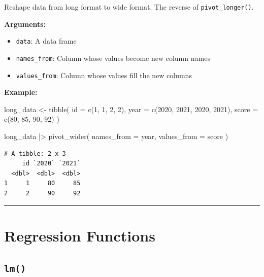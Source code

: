 \documentclass[
  letterpaper,
  DIV=11,
  numbers=noendperiod]{scrreprt}
\newenvironment{Shaded}{\begin{snugshade}}{\end{snugshade}}
\newcommand{\AttributeTok}[1]{\textcolor[rgb]{0.40,0.45,0.13}{#1}}
\newcommand{\DecValTok}[1]{\textcolor[rgb]{0.68,0.00,0.00}{#1}}
\newcommand{\FunctionTok}[1]{\textcolor[rgb]{0.28,0.35,0.67}{#1}}
\newcommand{\NormalTok}[1]{\textcolor[rgb]{0.00,0.23,0.31}{#1}}
\newcommand{\OtherTok}[1]{\textcolor[rgb]{0.00,0.23,0.31}{#1}}
\newcommand{\SpecialCharTok}[1]{\textcolor[rgb]{0.37,0.37,0.37}{#1}}
\providecommand{\tightlist}{%
  \setlength{\itemsep}{0pt}\setlength{\parskip}{0pt}}
\begin{document}
Reshape data from long format to wide format. The reverse of
\texttt{pivot\_longer()}.

\textbf{Arguments:}

\begin{itemize}
\tightlist
\item
  \texttt{data}: A data frame
\item
  \texttt{names\_from}: Column whose values become new column names
\item
  \texttt{values\_from}: Column whose values fill the new columns
\end{itemize}

\textbf{Example:}

\begin{Shaded}
\begin{Highlighting}[]
\NormalTok{long\_data }\OtherTok{\textless{}{-}} \FunctionTok{tibble}\NormalTok{(}
  \AttributeTok{id =} \FunctionTok{c}\NormalTok{(}\DecValTok{1}\NormalTok{, }\DecValTok{1}\NormalTok{, }\DecValTok{2}\NormalTok{, }\DecValTok{2}\NormalTok{),}
  \AttributeTok{year =} \FunctionTok{c}\NormalTok{(}\DecValTok{2020}\NormalTok{, }\DecValTok{2021}\NormalTok{, }\DecValTok{2020}\NormalTok{, }\DecValTok{2021}\NormalTok{),}
  \AttributeTok{score =} \FunctionTok{c}\NormalTok{(}\DecValTok{80}\NormalTok{, }\DecValTok{85}\NormalTok{, }\DecValTok{90}\NormalTok{, }\DecValTok{92}\NormalTok{)}
\NormalTok{)}

\NormalTok{long\_data }\SpecialCharTok{|\textgreater{}}
  \FunctionTok{pivot\_wider}\NormalTok{(}
    \AttributeTok{names\_from =}\NormalTok{ year,}
    \AttributeTok{values\_from =}\NormalTok{ score}
\NormalTok{  )}
\end{Highlighting}
\end{Shaded}

\begin{verbatim}
# A tibble: 2 x 3
     id `2020` `2021`
  <dbl>  <dbl>  <dbl>
1     1     80     85
2     2     90     92
\end{verbatim}

\begin{center}\rule{0.5\linewidth}{0.5pt}\end{center}

\section{Regression Functions}\label{regression-functions}

\subsection{\texorpdfstring{\texttt{lm()}}{lm()}}\label{lm}
\end{document}
